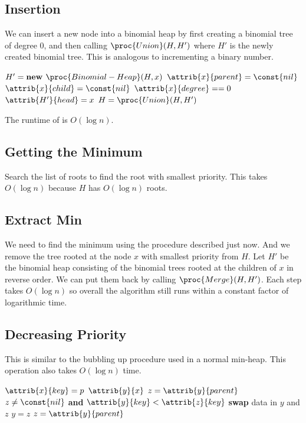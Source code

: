 \subsection{Insertion}

We can insert a new node into a binomial heap by first creating a binomial tree of degree 0, and then calling $\proc{Union}(H,H')$ where $H'$ is the newly created binomial tree. This is analogous to incrementing a binary number.

\begin{codebox}
    \li $H' = \textbf{new } \proc{Binomial-Heap}(H,x)$
    \li $\attrib{x}{parent} = \const{nil}$
    \li $\attrib{x}{child} = \const{nil}$
    \li $\attrib{x}{degree} == 0$
    \li $\attrib{H'}{head} = x$
    \li $H = \proc{Union}(H,H')$  
\end{codebox}

The runtime of  is $O(\log n)$.

\subsection{Getting the Minimum}

Search the list of roots to find the root with smallest priority. This takes $O(\log n)$ because $H$ has $O(\log n)$ roots.

\subsection{Extract Min}

We need to find the minimum using the procedure described just now. And we remove the tree rooted at the node $x$ with smallest priority from $H$. Let $H'$ be the binomial heap consisting of the binomial trees rooted at the children of $x$ in reverse order. We can put them back by calling $\proc{Merge}(H,H')$. Each step takes $O(\log n)$ so overall the algorithm still runs within a constant factor of logarithmic time.

\subsection{Decreasing Priority}

This is similar to the bubbling up procedure used in a normal min-heap. This operation also takes $O(\log n)$ time.

\begin{codebox}
    \li $\attrib{x}{key} = p$
    \li $\attrib{y}{x}$ 
    \li $z = \attrib{y}{parent}$
    \li \While $z \neq \const{nil}$ \textbf{and} $\attrib{y}{key} < \attrib{z}{key}$ \Do
        \li \textbf{swap} data in $y$ and $z$
        \li $y = z$
        \li $z = \attrib{y}{parent}$  
\end{codebox}